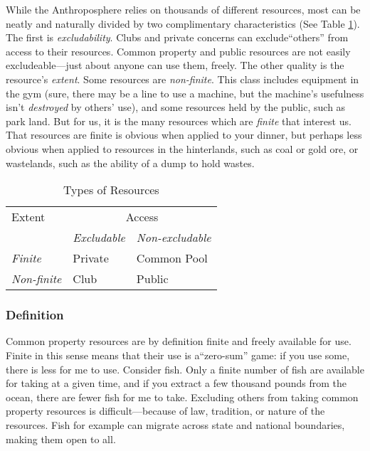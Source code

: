 While the Anthroposphere relies on thousands of different resources, most can be neatly and naturally divided by two complimentary characteristics (See Table \ref{tab:goods}). The first is \emph{excludability}. Clubs and private concerns can exclude``others'' from access to their resources. Common property and public resources are not easily excludeable---just about anyone can use them, freely. The other quality is the resource's \emph{extent}. Some resources are \emph{non-finite}. This class includes equipment in the gym (sure, there may be a line to use a machine, but the machine's usefulness isn't \textit{destroyed} by others' use), and some resources held by the public, such as park land. But for us, it is the many resources which are \emph{finite} that interest us. That resources are finite is obvious when applied to your dinner, but perhaps less obvious when applied to resources in the hinterlands, such as coal or gold ore, or wastelands, such as the ability of a dump to hold wastes.\\

\begin{table} 
\caption{Types of Resources}
\label{tab:goods}
\centering
\begin{tabular}{@{}lll@{}} \toprule
Extent & \multicolumn{2}{c}{Access}\\ \cmidrule(r){2-3} 
 &\emph{Excludable} & \emph{Non-excludable}\\
 \emph{Finite} & Private & Common Pool\\
 \emph{Non-finite} & Club    & Public\\ \bottomrule
\end{tabular}
\end{table}

\subsubsection{Definition}
Common property resources are by definition finite and freely available for use. Finite in this sense means that their use is a``zero-sum'' game: if you use some, there is less for me to use. Consider fish. Only a finite number of fish are available for taking at a given time, and if you extract a few thousand pounds from the ocean, there are fewer fish for me to take. Excluding others from taking common property resources is difficult---because of law, tradition, or nature of the resources. Fish for example can migrate across state and national boundaries, making them open to all.\\

